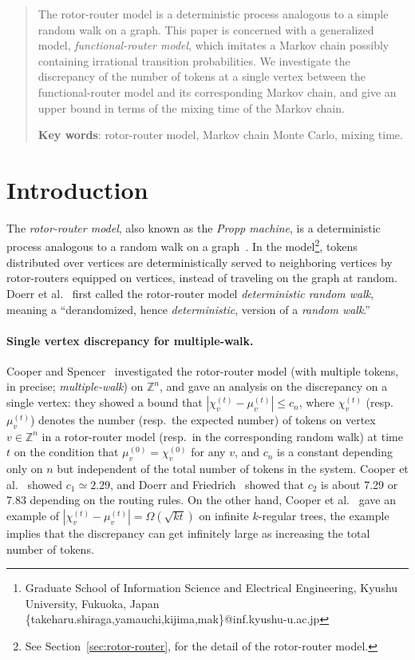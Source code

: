 \documentclass[letter, 11pt]{article}
\author{
 Takeharu Shiraga\footnote{
   Graduate School of Information Science and Electrical Engineering, 
   Kyushu University, Fukuoka, Japan\protect\\ 
{\ttfamily \{takeharu.shiraga,yamauchi,kijima,mak\}@inf.kyushu-u.ac.jp}} \and 
 Yukiko Yamauchi\footnotemark[1] \and 
 Shuji Kijima\footnotemark[1] \and
 Masafumi Yamashita\footnotemark[1]
}
\newcommand{\1}{\mbox{1}\hspace{-0.25em}\mbox{l}}
\begin{document}
\makeatletter
\makeatother
\maketitle
\begin{abstract}
The rotor-router model is a deterministic process analogous to a
simple random walk on a graph.
 This paper is concerned with a generalized model, {\em
functional-router model},
   which imitates a Markov chain possibly containing irrational transition probabilities.
 We investigate the discrepancy of the number of tokens at a single vertex
    between the functional-router model and its corresponding Markov chain, and 
   give an upper bound in terms of the mixing time of the Markov chain. 


\smallskip
\noindent
{\bf Key words}: 
  rotor-router model, 
  Markov chain Monte Carlo, 
  mixing time. 
\end{abstract}


\section{Introduction}
The \textit{rotor-router model}, also known as the {\em Propp machine}, 
  is a deterministic process analogous to a random walk on a graph~\cite{PDDK96, CS06, KKM12}. 
 In the model\footnote{See Section~\ref{sec:rotor-router}, for the detail of the rotor-router model. }, 
   tokens distributed over vertices are deterministically served to neighboring vertices 
    by rotor-routers equipped on vertices, instead of traveling on the graph at random. 
Doerr et al.~\cite{CDST07, DF09} first called the rotor-router model {\em deterministic random walk}, 
  meaning a ``derandomized, hence {\em deterministic}, version of a {\em random walk}.'' 


\paragraph{Single vertex discrepancy for multiple-walk.}
Cooper and Spencer~\cite{CS06} investigated 
  the rotor-router model (with multiple tokens, in precise; {\em multiple-walk}) on $\mathbb{Z}^n$, and  
   gave an analysis on the discrepancy on a single vertex: 
 they showed a bound that $|\chi^{(t)}_v - \mu^{(t)}_v| \leq c_n$, 
  where 
   $\chi^{(t)}_v$ (resp.\ $\mu^{(t)}_v$) denotes 
   the number (resp.\ the expected number) of tokens on vertex $v \in \mathbb{Z}^n$ 
   in a rotor-router model (resp.\ in the corresponding random walk) at time $t$ 
   on the condition that $\mu^{(0)}_v = \chi^{(0)}_v$ for any $v$, and 
   $c_n$ is a constant depending only on $n$ but independent of the total number of tokens in the system. 
 Cooper et al.~\cite{CDST07} showed $c_1 \simeq 2.29$, and  
 Doerr and Friedrich~\cite{DF09} showed that 
  $c_2$ is about 7.29 or 7.83 depending on the routing rules. 
On the other hand, 
 Cooper et al.~\cite{CDFS10} gave 
  an example of $|\chi^{(t)}_v - \mu^{(t)}_v| = \Omega(\sqrt{kt})$ on infinite $k$-regular trees, 
  the example implies that the discrepancy can get infinitely large as increasing the total number of tokens. 
\end{document}
